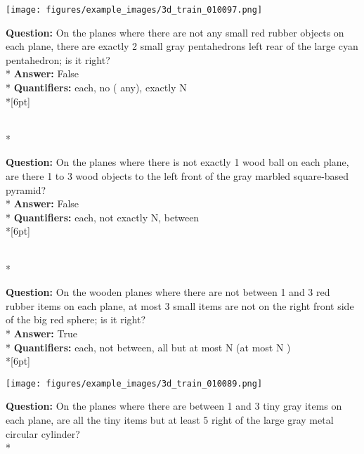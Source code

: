 \begin{figure*}
  \begin{minipage}{0.48\textwidth}
    \texttt{[image: figures/example\_images/3d\_train\_010097.png]}
    \begin{minipage}[t][2.2cm][t]{1\textwidth}
      \footnotesize
      \textbf{Question:} On the planes where there are not any small red rubber objects on each plane, there are exactly 2 small gray pentahedrons left rear of the large cyan pentahedron; is it right? \\*
      \textbf{Answer:}  False \\*
      \textbf{Quantifiers:} each, no ( any), exactly N \\*[6pt]
    \end{minipage}\\*
    \begin{minipage}[t][2.2cm][t]{1\textwidth}
      \footnotesize
      \textbf{Question:} On the planes where there is not exactly 1 wood ball on each plane, are there 1 to 3 wood objects to the left front of the gray marbled square-based pyramid? \\*
      \textbf{Answer:} False \\*
      \textbf{Quantifiers:} each, not exactly N, between \\*[6pt]
    \end{minipage}\\*
    \begin{minipage}[t][2.2cm][t]{1\textwidth}
      \footnotesize
      \textbf{Question:} On the wooden planes where there are not between 1 and 3 red rubber items on each plane, at most 3 small items are not on the right front side of the big red sphere; is it right? \\*
      \textbf{Answer:} True \\*
      \textbf{Quantifiers:} each, not between, all but at most N (at most N )  \\*[6pt]
    \end{minipage}
  \end{minipage}
  \hspace{3.5mm}
  \begin{minipage}{0.48\textwidth}
    \texttt{[image: figures/example\_images/3d\_train\_010089.png]}
    \begin{minipage}[t][2.2cm][t]{1\textwidth}
      \footnotesize
      \textbf{Question:} On the planes where there are between 1 and 3 tiny gray items on each plane, are all the tiny items but at least 5 right of the large gray metal circular cylinder? \\*

\end{minipage}
\end{minipage}
\end{figure*}

